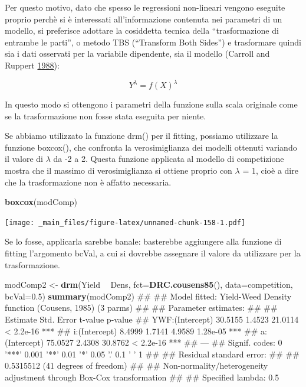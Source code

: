 \documentclass[a4paper,12pt,oneside]{book}
\newenvironment{Shaded}{\begin{snugshade}}{\end{snugshade}}
\newcommand{\KeywordTok}[1]{\textcolor[rgb]{0.13,0.29,0.53}{\textbf{#1}}}
\newcommand{\DataTypeTok}[1]{\textcolor[rgb]{0.13,0.29,0.53}{#1}}
\newcommand{\FloatTok}[1]{\textcolor[rgb]{0.00,0.00,0.81}{#1}}
\newcommand{\StringTok}[1]{\textcolor[rgb]{0.31,0.60,0.02}{#1}}
\newcommand{\OperatorTok}[1]{\textcolor[rgb]{0.81,0.36,0.00}{\textbf{#1}}}
\newcommand{\NormalTok}[1]{#1}
\theoremstyle{definition}
\theoremstyle{definition}
\theoremstyle{definition}
\theoremstyle{remark}
\begin{document}
Per questo motivo, dato che spesso le regressioni non-lineari vengono
eseguite proprio perchè si è interessati all'informazione contenuta nei
parametri di un modello, si preferisce adottare la cosiddetta tecnica
della ``trasformazione di entrambe le parti'', o metodo TBS (``Transform
Both Sides'') e trasformare quindi sia i dati osservati per la variabile
dipendente, sia il modello (Carroll and Ruppert
\protect\hyperlink{ref-carroll1988_Transformationweightingregression}{1988}):

\[Y^\lambda  = f(X)^\lambda\]

In questo modo si ottengono i parametri della funzione sulla scala
originale come se la trasformazione non fosse stata eseguita per niente.

Se abbiamo utilizzato la funzione drm() per il fitting, possiamo
utilizzare la funzione boxcox(), che confronta la verosimiglianza dei
modelli ottenuti variando il valore di \(\lambda\) da -2 a 2. Questa
funzione applicata al modello di competizione mostra che il massimo di
verosimiglianza si ottiene proprio con \(\lambda\) = 1, cioè a dire che
la trasformazione non è affatto necessaria.

\begin{Shaded}
\begin{Highlighting}[]
\KeywordTok{boxcox}\NormalTok{(modComp)}
\end{Highlighting}
\end{Shaded}

\texttt{[image: \_main\_files/figure-latex/unnamed-chunk-158-1.pdf]}

Se lo fosse, applicarla sarebbe banale: basterebbe aggiungere alla
funzione di fitting l'argomento bcVal, a cui si dovrebbe assegnare il
valore da utilizzare per la trasformazione.

\begin{Shaded}
\begin{Highlighting}[]
\NormalTok{modComp2 <-}\StringTok{ }\KeywordTok{drm}\NormalTok{(Yield }\OperatorTok{~}\StringTok{ }\NormalTok{Dens, }\DataTypeTok{fct=}\KeywordTok{DRC.cousens85}\NormalTok{(), }\DataTypeTok{data=}\NormalTok{competition,}
               \DataTypeTok{bcVal=}\FloatTok{0.5}\NormalTok{)}
\KeywordTok{summary}\NormalTok{(modComp2)}
\NormalTok{## }
\NormalTok{## Model fitted: Yield-Weed Density function (Cousens, 1985) (3 parms)}
\NormalTok{## }
\NormalTok{## Parameter estimates:}
\NormalTok{## }
\NormalTok{##                 Estimate Std. Error t-value   p-value    }
\NormalTok{## YWF:(Intercept)  30.5155     1.4523 21.0114 < 2.2e-16 ***}
\NormalTok{## i:(Intercept)     8.4999     1.7141  4.9589  1.28e-05 ***}
\NormalTok{## a:(Intercept)    75.0527     2.4308 30.8762 < 2.2e-16 ***}
\NormalTok{## ---}
\NormalTok{## Signif. codes:  0 '***' 0.001 '**' 0.01 '*' 0.05 '.' 0.1 ' ' 1}
\NormalTok{## }
\NormalTok{## Residual standard error:}
\NormalTok{## }
\NormalTok{##  0.5315512 (41 degrees of freedom)}
\NormalTok{## }
\NormalTok{## Non-normality/heterogeneity adjustment through Box-Cox transformation}
\NormalTok{## }
\NormalTok{## Specified lambda: 0.5}
\end{Highlighting}
\end{Shaded}
\end{document}
